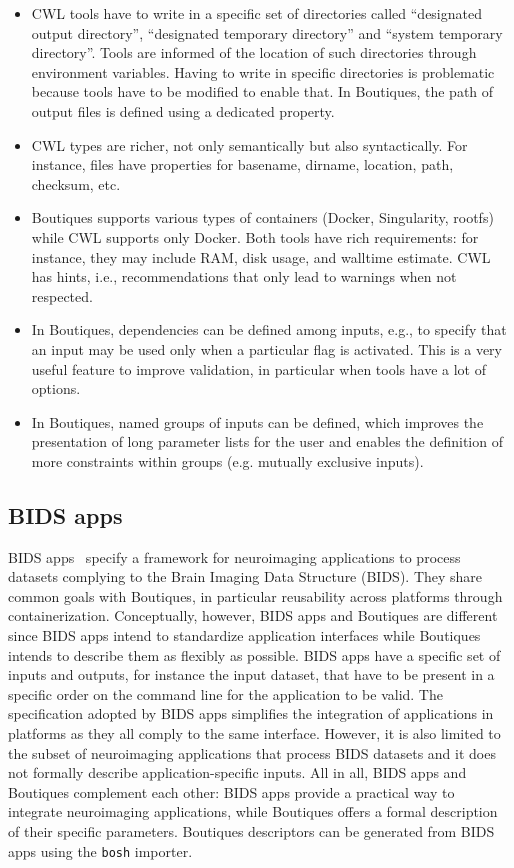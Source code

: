 \documentclass[a4paper,num-refs]{oup-contemporary}
\newcommand{\boutiques}{Boutiques\xspace}
\begin{document}
\begin{itemize}
\item CWL tools have to write in a specific set of directories called
``designated output directory'', ``designated temporary directory''
and ``system temporary directory''. Tools are informed of the location
of such directories through environment variables. Having to write in
specific directories is problematic because tools have to be modified
to enable that. In \boutiques, the path of output files is defined
using a dedicated property.
\item CWL types are richer, not only
semantically but also syntactically. For instance, files have
properties for basename, dirname, location, path, checksum, etc.
\item \boutiques supports various types of containers (Docker,
  Singularity, rootfs) while CWL supports only Docker. Both tools have
  rich requirements: for instance, they may include RAM, disk usage,
  and walltime estimate. CWL has hints, i.e., recommendations that
  only lead to warnings when not respected.
\item In \boutiques, dependencies can be defined among inputs, e.g., to
specify that an input may be used only when a particular flag is
activated. This is a very useful feature to improve validation, in
particular when tools have a lot of options.
\item In \boutiques, named
groups of inputs can be defined, which improves the presentation of
long parameter lists for the user and enables the definition of more
constraints within groups (e.g. mutually exclusive inputs).
\end{itemize}

\subsection{BIDS apps}

BIDS apps~\cite{gorgolewski2017bids} specify a framework for
neuroimaging applications to process datasets complying to the Brain
Imaging Data Structure (BIDS). They share common goals with
\boutiques, in particular reusability across platforms through
containerization. Conceptually, however, BIDS apps and \boutiques are
different since BIDS apps intend to standardize application interfaces
while \boutiques intends to describe them as flexibly as
possible. BIDS apps have a specific set of inputs and outputs, for
instance the input dataset, that have to be present in a specific
order on the command line for the application to be valid. The
specification adopted by BIDS apps simplifies the integration of
applications in platforms as they all comply to the same
interface. However, it is also limited to the subset of neuroimaging
applications that process BIDS datasets and it does not formally
describe application-specific inputs. All in all, BIDS apps and
\boutiques complement each other: BIDS apps provide a practical way to
integrate neuroimaging applications, while \boutiques offers a formal
description of their specific parameters.  \boutiques descriptors can
be generated from BIDS apps using the \texttt{bosh} importer. 
\end{document}
